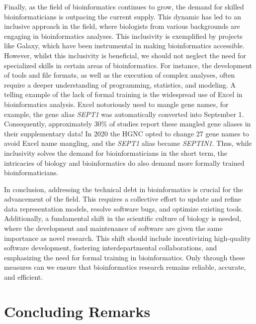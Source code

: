 Finally, as the field of bioinformatics continues to grow, the demand for skilled bioinformaticians is outpacing the current supply. This dynamic has led to an inclusive approach in the field, where biologists from various backgrounds are engaging in bioinformatics analyses. This inclusivity is exemplified by projects like Galaxy\cite{galaxy}, which have been instrumental in making bioinformatics accessible. However, whilst this inclusivity is beneficial, we should not neglect the need for specialized skills in certain areas of bioinformatics. For instance, the development of tools and file formats, as well as the execution of complex analyses, often require a deeper understanding of programming, statistics, and modeling. A telling example of the lack of formal training is the widespread use of Excel in bioinformatics analysis. Excel notoriously used to mangle gene names\cite{Zeeberg2004}, for example, the gene alias \textit{SEPT1} was automatically converted into September 1. Consequently, approximately $30\%$ of studies report these mangled gene aliases in their supplementary data\cite{Abeysooriya2021}! In 2020 the HGNC opted to change 27 gene names to avoid Excel name mangling, and the \textit{SEPT1} alias became \textit{SEPTIN1}. Thus, while inclusivity solves the demand for bioinformaticians in the short term, the intricacies of biology and bioinformatics do also demand more formally trained bioinformaticians.

In conclusion, addressing the technical debt in bioinformatics is crucial for the advancement of the field. This requires a collective effort to update and refine data representation models, resolve software bugs, and optimize existing tools. Additionally, a fundamental shift in the scientific culture of biology is needed, where the development and maintenance of software are given the same importance as novel research. This shift should include incentivizing high-quality software development, fostering interdepartmental collaborations, and emphasizing the need for formal training in bioinformatics. Only through these measures can we ensure that bioinformatics research remains reliable, accurate, and efficient. 

\section{Concluding Remarks}

